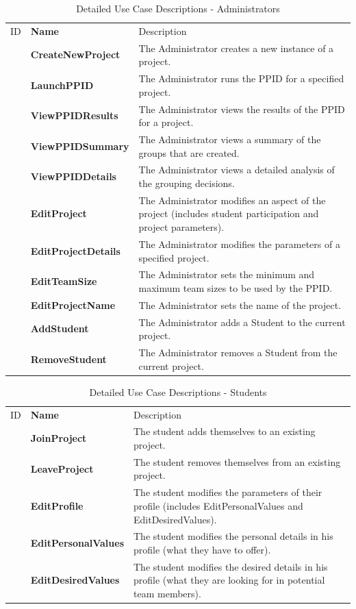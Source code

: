 \documentclass[12pt,letterpaper]{article}
\begin{document}
\begin{table}[H]
	\caption{Detailed Use Case Descriptions - Administrators}
	\vspace{1em}
	\begin{tabu} to 
	    \tableheader{}ID & Name & Description\\
		\createnewproject{} & CreateNewProject & The Administrator creates a new instance of a project.\\
		\launchppid{} & LaunchPPID & The Administrator runs the PPID for a specified project.\\
		\viewppidresults{} & ViewPPIDResults & The Administrator views the results of the PPID for a project. \\
		\viewppidsummary{} & ViewPPIDSummary & The Administrator views a summary of the groups that are created. \\
		\viewppiddetails{} & ViewPPIDDetails & The Administrator views a detailed analysis of the grouping decisions. \\
		\editproject{} & EditProject & The Administrator modifies an aspect of the project (includes student participation 
		and project parameters).\\
		\editprojectdetails{} & EditProjectDetails & The Administrator modifies the parameters of a specified project.\\
		\editteamsize{} & EditTeamSize & The Administrator sets the minimum and maximum team sizes to be used by the PPID. \\
		\editprojectname{} & EditProjectName & The Administrator sets the name of the project. \\
		\addstudent{} & AddStudent & The Administrator adds a Student to the current project.\\
		\removestudent{} & RemoveStudent & The Administrator removes a Student from the current project.\\
	\end{tabu}
\end{table}

\begin{table}[H]
	\caption{Detailed Use Case Descriptions - Students}
	\vspace{1em}
	\begin{tabu} to 
	    \tableheader{}ID & Name & Description\\
		\joinproject{} & JoinProject & The student adds themselves to an existing project.\\
		\leaveproject{} & LeaveProject & The student removes themselves from an existing project.\\
		\editprofile{} & EditProfile & The student modifies the parameters of their profile (includes EditPersonalValues and EditDesiredValues).\\
		\editpersonalvalues{} & EditPersonalValues & The student modifies the personal details in his profile (what they have to offer). \\
		\editdesiredvalues{} & EditDesiredValues & The student modifies the desired details in his profile (what they are looking for in potential team members). \\
	\end{tabu}
\end{table}
\end{document}
